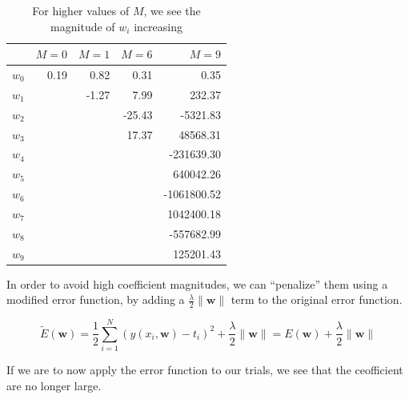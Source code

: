 \documentclass{tufte-handout}
\begin{document}
\begin{table}[h]
  \begin{center}
    \begin{tabular}{lrrrr}
      \toprule
       & $M = 0$ & $M = 1$ & $M = 6$ & $M = 9$ \\
      \midrule
      $w_0$ & 0.19 &  0.82 &   0.31 &        0.35 \\
      $w_1$ &      & -1.27 &   7.99 &      232.37 \\
      $w_2$ &      &       & -25.43 &    -5321.83 \\
      $w_3$ &      &       &  17.37 &    48568.31 \\
      $w_4$ &      &       &        &  -231639.30 \\
      $w_5$ &      &       &        &   640042.26 \\
      $w_6$ &      &       &        & -1061800.52 \\
      $w_7$ &      &       &        &  1042400.18 \\
      $w_8$ &      &       &        &  -557682.99 \\
      $w_9$ &      &       &        &   125201.43 \\
      \bottomrule
    \end{tabular}
  \end{center}
  \caption{For higher values of $M$, we see the magnitude of $w_i$ increasing}
  \label{tab:font-sizes}
\end{table}

In order to avoid high coefficient magnitudes, we can ``penalize'' them using
a modified error function, by adding a $\frac{\lambda}{2}\|\mathbf{w}\|$ term
to the original error function.

\begin{equation}
  \widetilde{E}(\mathbf{w}) =
    \frac{1}{2}\sum\limits_{i = 1}^N(y(x_i, \mathbf{w}) - t_i)^2
      + \frac{\lambda}{2}\|\mathbf{w}\|
    = E(\mathbf{w}) + \frac{\lambda}{2}\|\mathbf{w}\|
\end{equation}

If we are to now apply the error function to our trials, we see that the
ceofficient are no longer large.
\end{document}
